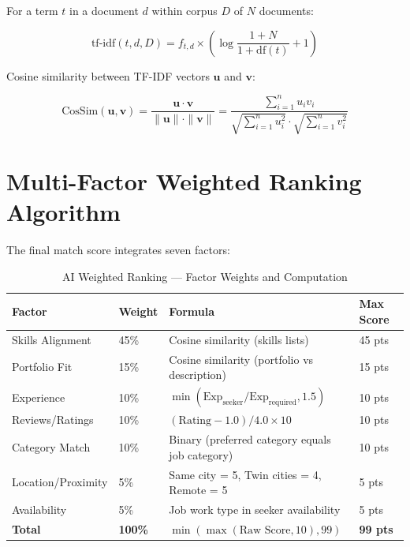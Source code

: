\documentclass[12pt,a4paper,oneside]{report}
\begin{document}
For a term $t$ in a document $d$ within corpus $D$ of $N$ documents:

\begin{equation}
\text{tf-idf}(t, d, D) = f_{t,d} \times \left(\log\frac{1+N}{1+\text{df}(t)} + 1\right)
\end{equation}

Cosine similarity between TF-IDF vectors $\mathbf{u}$ and $\mathbf{v}$:

\begin{equation}
\text{CosSim}(\mathbf{u}, \mathbf{v}) = \frac{\mathbf{u} \cdot \mathbf{v}}{\|\mathbf{u}\| \cdot \|\mathbf{v}\|} = \frac{\sum_{i=1}^n u_i v_i}{\sqrt{\sum_{i=1}^n u_i^2} \cdot \sqrt{\sum_{i=1}^n v_i^2}}
\end{equation}

\section{Multi-Factor Weighted Ranking Algorithm}

The final match score integrates seven factors:

\begin{table}[H]
  \centering
  \caption{AI Weighted Ranking — Factor Weights and Computation}
  \label{tab:ai-weights}
  \begin{tabularx}{\textwidth}{llXl}
    \toprule
    \textbf{Factor} & \textbf{Weight} & \textbf{Formula} & \textbf{Max Score} \\
    \midrule
    Skills Alignment  & 45\% & Cosine similarity (skills lists)  & 45 pts \\
    Portfolio Fit      & 15\% & Cosine similarity (portfolio vs description) & 15 pts \\
    Experience         & 10\% & $\min(\text{Exp}_\text{seeker}/\text{Exp}_\text{required}, 1.5)$ & 10 pts \\
    Reviews/Ratings    & 10\% & $(\text{Rating}-1.0)/4.0 \times 10$ & 10 pts \\
    Category Match     & 10\% & Binary (preferred category equals job category) & 10 pts \\
    Location/Proximity & 5\%  & Same city = 5, Twin cities = 4, Remote = 5 & 5 pts \\
    Availability       & 5\%  & Job work type in seeker availability & 5 pts \\
    \midrule
    \textbf{Total}    & \textbf{100\%} & $\min(\max(\text{Raw Score}, 10), 99)$ & \textbf{99 pts} \\
    \bottomrule
  \end{tabularx}
\end{table}
\end{document}
